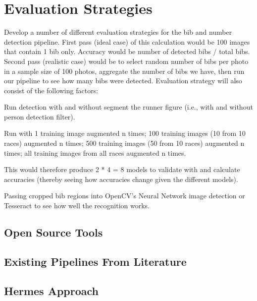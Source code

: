 \chapter{Evaluation Strategies}
\label{ch:evaluation_strategies}




Develop a number of different evaluation strategies for the bib and number detection pipeline. First pass (ideal case) of this calculation would be 100 images that contain 1 bib only. Accuracy would be number of detected bibs / total bibs. Second pass (realistic case) would be to select random number of bibs per photo in a sample size of 100 photos, aggregate the number of bibs we have, then run our pipeline to see how many bibs were detected. Evaluation strategy will also consist of the following factors:

Run detection with and without segment the runner figure (i.e., with and without person detection filter).

Run with 1 training image augmented n times; 100 training images (10 from 10 races) augmented n times; 500 training images (50 from 10 races) augmented n times; all training images from all races augmented n times. 

This would therefore produce 2 * 4 = 8 models to validate with and calculate accuracies (thereby seeing how accuracies change given the different models).

Passing cropped bib regions into OpenCV's Neural Network image detection or Tesseract to see how well the recognition works.


\section{Open Source Tools}

\section{Existing Pipelines From Literature}

\section{Hermes Approach}

